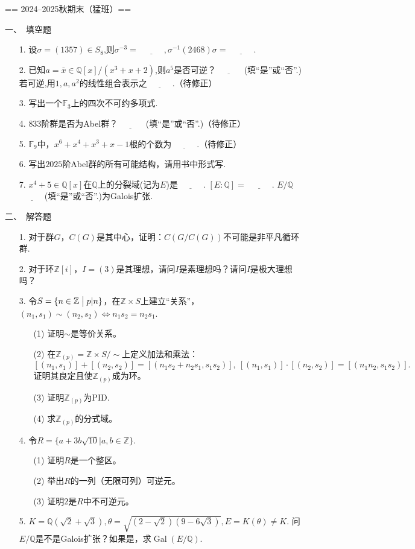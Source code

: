 == 2024--2025秋期末（猛班）==

一、\ 填空题
\begin{itemize}
\item[1.]设$\sigma=(1357)\in S_8$,则$\sigma^{-3}=\underline{\qquad\quad},\sigma^{-1}(2468)\sigma=\underline{\qquad\quad}$.
\item[2.]已知$a=\bar{x}\in\mathbb{Q}[x]/(x^3+x+2)$,则$a^5$是否可逆？$\underline{\qquad\quad}$ (填“是”或“否”.)若可逆,用$1,a,a^2$的线性组合表示之$\underline{\qquad\quad}$.（待修正）
\item[3.]写出一个$\mathbb{F}_3$上的四次不可约多项式.
\item[4.]$833$阶群是否为Abel群？$\underline{\qquad\quad}$ (填“是”或“否”.)（待修正）\\
\item[5.]$\mathbb{F}_9$中，$x^6+x^4+x^3+x-1$根的个数为$\underline{\qquad\quad}$.（待修正）
\item[6.]写出$2025$阶Abel群的所有可能结构，请用书中形式写.
\item[7.]$x^4+5\in\mathbb{Q}[x]$在$\mathbb{Q}$上的分裂域(记为$E$)是$\underline{\qquad\quad}$.
$[E:\mathbb{Q}]=\underline{\qquad\quad}$.
$E/\mathbb{Q}$ $\underline{\qquad\quad}$(填“是”或“否”.)为Galois扩张.
\end{itemize}
二、\ 解答题
\begin{itemize}
\item[1.]对于群$G$，$C(G)$是其中心，证明：$C(G/C(G))$不可能是非平凡循环群.\\
\item[2.]对于环$\mathbb{Z}[i]$，$I=(3)$是其理想，请问$I$是素理想吗？请问$I$是极大理想吗？\\
\item[3.]令$S=\{n \in \mathbb{Z} \bigm| p|n\}$，在$\mathbb{Z}\times S$上建立“关系”，
$(n_1,s_1) \sim(n_2,s_2) \Leftrightarrow n_1s_2=n_2s_1.$
    \begin{itemize}
        \item[(1)] 证明$\sim$是等价关系。
        \item[(2)] 在$\mathbb{Z}_{(p)}=\mathbb{Z}\times S/\sim$上定义加法和乘法：
        $$[(n_1,s_1)]+[(n_2,s_2)]=[(n_1s_2+n_2s_1,s_1s_2)],\ [(n_1,s_1)] \cdot [(n_2,s_2)]=[(n_1n_2,s_1s_2)].$$
        证明其良定且使$\mathbb{Z}_{(p)}$成为环。
        \item[(3)] 证明$\mathbb{Z}_{(p)}$为PID.
        \item[(4)] 求$\mathbb{Z}_{(p)}$的分式域。
    \end{itemize}
\item[4.]令$R=\{a+3b\sqrt{10}|a,b \in \mathbb{Z}\}$.
    \begin{itemize}
        \item[(1)] 证明$R$是一个整区。
        \item[(2)] 举出$R$的一列（无限可列）可逆元。
        \item[(3)] 证明$2$是$R$中不可逆元。
    \end{itemize}
\item[5.]$K=\mathbb{Q}(\sqrt{2}+\sqrt{3}),\theta=\sqrt{(2-\sqrt{2})(9-6\sqrt{3})},E=K(\theta)\neq K$.
问$E/\mathbb{Q}$是不是Galois扩张？如果是，求$\operatorname{Gal}(E/\mathbb{Q})$.
\end{itemize}

